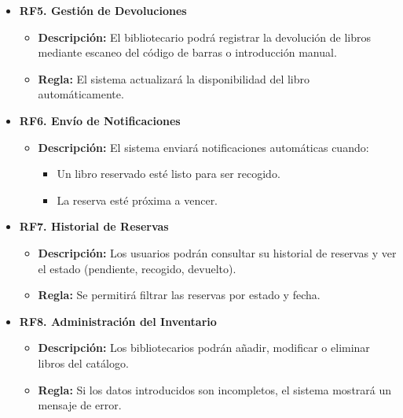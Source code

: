 \documentclass{scrreprt}
\begin{document}
\begin{itemize}
\begin{itemize}
\begin{itemize}
        \end{itemize}
    \end{itemize}
    \item \textbf{RF5. Gestión de Devoluciones}
    \begin{itemize}
        \item \textbf{Descripción:} El bibliotecario podrá registrar la devolución de libros mediante escaneo del código de barras o introducción manual.
        \item \textbf{Regla:} El sistema actualizará la disponibilidad del libro automáticamente.
    \end{itemize}
    \item \textbf{RF6. Envío de Notificaciones}
    \begin{itemize}
        \item \textbf{Descripción:} El sistema enviará notificaciones automáticas cuando:
        \begin{itemize}
            \item Un libro reservado esté listo para ser recogido.
            \item La reserva esté próxima a vencer.
        \end{itemize}
    \end{itemize}
    \item \textbf{RF7. Historial de Reservas}
    \begin{itemize}
        \item \textbf{Descripción:} Los usuarios podrán consultar su historial de reservas y ver el estado (pendiente, recogido, devuelto).
        \item \textbf{Regla:} Se permitirá filtrar las reservas por estado y fecha.
    \end{itemize}
    \item \textbf{RF8. Administración del Inventario}
    \begin{itemize}
        \item \textbf{Descripción:} Los bibliotecarios podrán añadir, modificar o eliminar libros del catálogo.
        \item \textbf{Regla:} Si los datos introducidos son incompletos, el sistema mostrará un mensaje de error.
    \end{itemize}
\end{itemize}
\end{document}
